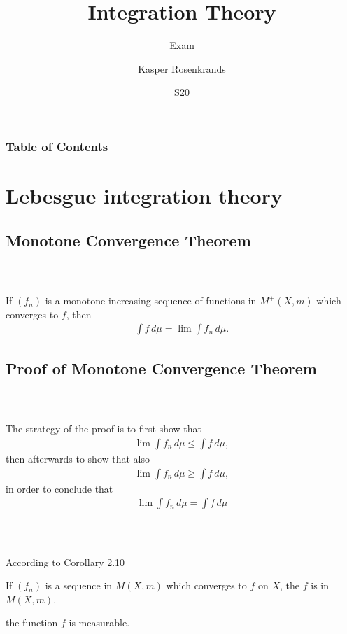 \documentclass{beamer}
\title{Integration Theory}
\subtitle{Exam}
\author{Kasper Rosenkrands}
\institute{Aalborg University}
\date{S20}
\numberwithin{equation}{section}
\begin{document}
\frame{\titlepage}

\begin{frame}
\frametitle{Table of Contents}
\tableofcontents[hideallsubsections]
\end{frame}

\section{Lebesgue integration theory}

\subsection{Monotone Convergence Theorem}

\begin{frame}\frametitle{{\normalsize \secname} \\ {\large \subsecname}}
    \begin{theorem}
        If $(f_n)$ is a monotone increasing sequence of functions in $M^+(X,m)$ which converges to $f$, then
        \begin{align}\label{eq:b4.6}
            \int f \,d\mu = \lim \int f_n  \,d\mu. 
        \end{align}
    \end{theorem}
\end{frame}

\subsection{Proof of Monotone Convergence Theorem}

\begin{frame}\frametitle{{\normalsize \secname} \\ {\large \subsecname}}
    The strategy of the proof is to first show that
    \begin{align}
        \lim \int f_n \, d\mu \leq \int f \, d\mu,
    \end{align}
    then afterwards to show that also
    \begin{align}
        \lim \int f_n \, d\mu \geq \int f \, d\mu,
    \end{align}
    in order to conclude that
    \begin{align}
        \lim \int f_n \, d\mu = \int f \, d\mu
    \end{align}
\end{frame}

\begin{frame}\frametitle{{\normalsize \secname} \\ {\large \subsecname}}
    According to Corollary 2.10
    \begin{corollary}[2.10]
        If $(f_n)$ is a sequence in $M(X,m)$ which converges to $f$ on $X$, the $f$ is in $M(X,m)$.
    \end{corollary}
    the function $f$ is measurable.
\end{frame}
\end{document}
